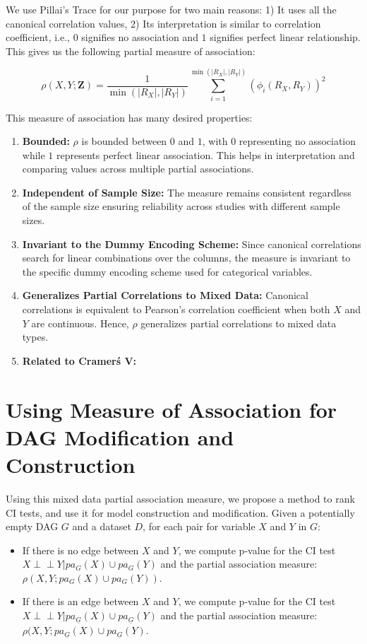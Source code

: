 \documentclass{uai2025} %
\def\ci{\perp\!\!\!\!\!\perp}
\begin{document}
We use Pillai's Trace for our purpose for two main reasons: 1) It uses all the
canonical correlation values, 2) Its interpretation is similar to correlation
coefficient, i.e., $ 0 $ signifies no association and $ 1 $ signifies perfect
linear relationship. This gives us the following partial measure of
association:

\begin{equation}
	\rho(X, Y; \bm{Z}) = \frac{1}{\min(\rvert R_X \rvert, \rvert R_Y \rvert)}
	\sum_{i=1}^{\min(\rvert R_X \rvert, \rvert R_Y \rvert)} (\phi_i(R_X, R_Y))^2
\end{equation}

This measure of association has many desired properties:

\begin{enumerate}
	\item \textbf{Bounded: } $ \rho $ is bounded between $ 0 $ and $ 1 $,
		with $ 0 $ representing no association while $ 1 $ represents
		perfect linear association. This helps in interpretation and
		comparing values across multiple partial associations.
	\item \textbf{Independent of Sample Size: } The measure remains consistent
		regardless of the sample size ensuring reliability across 
		studies with different sample sizes.
	\item \textbf{Invariant to the Dummy Encoding Scheme: } Since canonical
		correlations search for linear combinations over the columns,
		the measure is invariant to the specific dummy encoding
		scheme used for categorical variables.
	\item \textbf{Generalizes Partial Correlations to Mixed Data: }
		Canonical correlations is equivalent to Pearson's correlation coefficient
		when both $ X $ and $ Y $ are continuous. Hence, $ \rho $ generalizes
		partial correlations to mixed data types.
	\item \textbf{Related to Cramer\'s V: } 
\end{enumerate}

\section{Using Measure of Association for DAG Modification and Construction}
\label{sec:modification}

Using this mixed data partial association measure, we propose a method to rank
CI tests, and use it for model construction and modification. Given a
potentially empty DAG $ G $ and a dataset $ D $, for each pair for variable $ X
$ and $ Y $ in $ G $:
\begin{itemize}
	\item If there is no edge between $ X $ and $ Y $, we compute p-value for the CI test $ X \ci Y \rvert pa_G(X) \cup pa_G(Y) $ and the partial association measure: $ \rho(X, Y; pa_G(X) \cup pa_G(Y)) $.
	\item If there is an edge between $ X $ and $ Y $, we compute p-value for the CI test $ X \ci Y \rvert pa_{\underline{G}}(X) \cup pa_{\underline{G}}(Y) $ and the partial association measure: $ \rho(X, Y; pa_{\underline{G}}(X) \cup pa_{\underline{G}}(Y) $.
\end{itemize}
\end{document}

